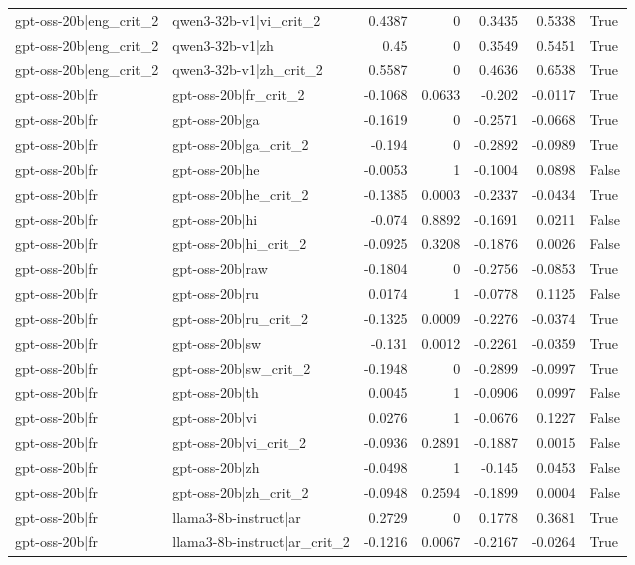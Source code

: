 \begin{table}
\begin{tabular}{l l r r r r l}
gpt-oss-20b|eng_crit_2 & qwen3-32b-v1|vi_crit_2 & 0.4387 & 0 & 0.3435 & 0.5338 & True \\
gpt-oss-20b|eng_crit_2 & qwen3-32b-v1|zh & 0.45 & 0 & 0.3549 & 0.5451 & True \\
gpt-oss-20b|eng_crit_2 & qwen3-32b-v1|zh_crit_2 & 0.5587 & 0 & 0.4636 & 0.6538 & True \\
gpt-oss-20b|fr & gpt-oss-20b|fr_crit_2 & -0.1068 & 0.0633 & -0.202 & -0.0117 & True \\
gpt-oss-20b|fr & gpt-oss-20b|ga & -0.1619 & 0 & -0.2571 & -0.0668 & True \\
gpt-oss-20b|fr & gpt-oss-20b|ga_crit_2 & -0.194 & 0 & -0.2892 & -0.0989 & True \\
gpt-oss-20b|fr & gpt-oss-20b|he & -0.0053 & 1 & -0.1004 & 0.0898 & False \\
gpt-oss-20b|fr & gpt-oss-20b|he_crit_2 & -0.1385 & 0.0003 & -0.2337 & -0.0434 & True \\
gpt-oss-20b|fr & gpt-oss-20b|hi & -0.074 & 0.8892 & -0.1691 & 0.0211 & False \\
gpt-oss-20b|fr & gpt-oss-20b|hi_crit_2 & -0.0925 & 0.3208 & -0.1876 & 0.0026 & False \\
gpt-oss-20b|fr & gpt-oss-20b|raw & -0.1804 & 0 & -0.2756 & -0.0853 & True \\
gpt-oss-20b|fr & gpt-oss-20b|ru & 0.0174 & 1 & -0.0778 & 0.1125 & False \\
gpt-oss-20b|fr & gpt-oss-20b|ru_crit_2 & -0.1325 & 0.0009 & -0.2276 & -0.0374 & True \\
gpt-oss-20b|fr & gpt-oss-20b|sw & -0.131 & 0.0012 & -0.2261 & -0.0359 & True \\
gpt-oss-20b|fr & gpt-oss-20b|sw_crit_2 & -0.1948 & 0 & -0.2899 & -0.0997 & True \\
gpt-oss-20b|fr & gpt-oss-20b|th & 0.0045 & 1 & -0.0906 & 0.0997 & False \\
gpt-oss-20b|fr & gpt-oss-20b|vi & 0.0276 & 1 & -0.0676 & 0.1227 & False \\
gpt-oss-20b|fr & gpt-oss-20b|vi_crit_2 & -0.0936 & 0.2891 & -0.1887 & 0.0015 & False \\
gpt-oss-20b|fr & gpt-oss-20b|zh & -0.0498 & 1 & -0.145 & 0.0453 & False \\
gpt-oss-20b|fr & gpt-oss-20b|zh_crit_2 & -0.0948 & 0.2594 & -0.1899 & 0.0004 & False \\
gpt-oss-20b|fr & llama3-8b-instruct|ar & 0.2729 & 0 & 0.1778 & 0.3681 & True \\
gpt-oss-20b|fr & llama3-8b-instruct|ar_crit_2 & -0.1216 & 0.0067 & -0.2167 & -0.0264 & True \\

\end{tabular}
\end{table}
